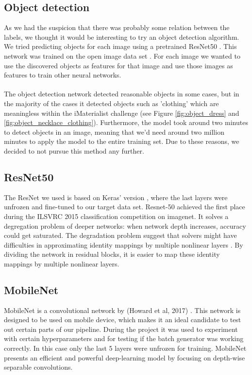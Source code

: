 \documentclass[twocolumn]{article}
\begin{document}
		\subsection{Object detection}
		As we had the suspicion that there was probably some relation between the labels, we thought it would be interesting to try an object detection algorithm. We tried predicting objects for each image using a pretrained ResNet50 \cite{DBLP:journals/corr/HeZRS15}. This network was trained on the open image data set \cite{openimages}. For each image we wanted to use the discovered objects as features for that image and use those images as features to train other neural networks. 
		\\
		\\
		The object detection network detected reasonable objects in some cases, but in the majority of the cases it detected objects such as 'clothing' which are meaningless within the iMaterialist challenge (see Figure \ref{fig:object_dress} and \ref{fig:object_necklace_clothing}). Furthermore, the model took around two minutes to detect objects in an image, meaning that we'd need around two million minutes to apply the model to the entire training set. Due to these reasons, we decided to not pursue this method any further.
		
        \subsection{ResNet50}
		The ResNet we used is based on Keras' version \cite{DBLP:journals/corr/HeZRS15}, where the last layers were unfrozen and fine-tuned to our target data set. Resnet-50 achieved the first place during the ILSVRC 2015 classification competition on imagenet. It solves a degregation problem of deeper networks: when network depth increases, accuracy could get saturated. The degradation problem suggest that solvers might have difficulties in approximating identity mappings by multiple nonlinear layers \cite{he2016deep}.
		By dividing the network in residual blocks, it is easier to map these identity mappings by multiple nonlinear layers.
		
		\subsection{MobileNet}
		MobileNet is a convolutional network by (Howard et al, 2017) \cite{howard2017mobilenets}. This network is designed to be used on mobile device, which makes it an ideal candidate to test out certain parts of our pipeline. During the project it was used to experiment with certain hyperparameters and for testing if the batch generator was working correctly. In this case only the last 5 layers were unfrozen for training. MobileNet presents an efficient and powerful deep-learning model by focusing on depth-wise separable convolutions.
\end{document}
